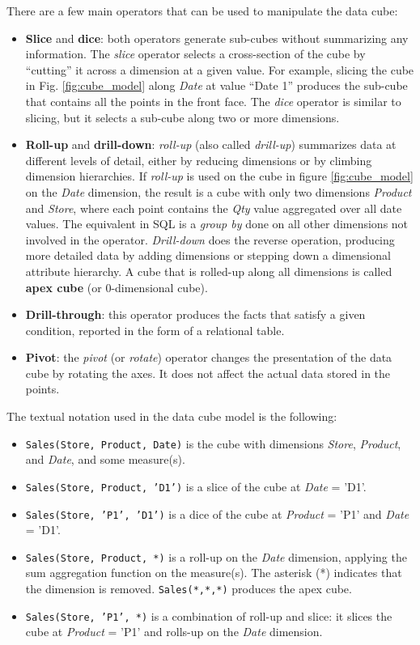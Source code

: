 There are a few main operators that can be used to manipulate the data cube:
\begin{itemize}
    \item \textbf{Slice} and \textbf{dice}: both operators generate sub-cubes without summarizing any information. The \textit{slice} operator selects a cross-section of the cube by ``cutting'' it across a dimension at a given value. For example, slicing the cube in Fig. \ref{fig:cube_model} along \textit{Date} at value ``Date 1'' produces the sub-cube that contains all the points in the front face. The \textit{dice} operator is similar to slicing, but it selects a sub-cube along two or more dimensions.
    \item \textbf{Roll-up} and \textbf{drill-down}: \textit{roll-up} (also called \textit{drill-up}) summarizes data at different levels of detail, either by reducing dimensions or by climbing dimension hierarchies. If \textit{roll-up} is used on the cube in figure \ref{fig:cube_model} on the \textit{Date} dimension, the result is a cube with only two dimensions \textit{Product} and \textit{Store}, where each point contains the \textit{Qty} value aggregated over all date values. The equivalent in SQL is a \textit{group by} done on all other dimensions not involved in the operator. \textit{Drill-down} does the reverse operation, producing more detailed data by adding dimensions or stepping down a dimensional attribute hierarchy. A cube that is rolled-up along all dimensions is called \textbf{apex cube} (or 0-dimensional cube).
    \item \textbf{Drill-through}: this operator produces the facts that satisfy a given condition, reported in the form of a relational table.
    \item \textbf{Pivot}: the \textit{pivot} (or \textit{rotate}) operator changes the presentation of the data cube by rotating the axes. It does not affect the actual data stored in the points.
\end{itemize}
The textual notation used in the data cube model is the following:
\begin{itemize}
    \item [-] \texttt{Sales(Store, Product, Date)} is the cube with dimensions \textit{Store}, \textit{Product}, and \textit{Date}, and some measure(s).
    \item [-] \texttt{Sales(Store, Product, 'D1')} is a slice of the cube at \textit{Date} = 'D1'.
    \item [-] \texttt{Sales(Store, 'P1', 'D1')} is a dice of the cube at \textit{Product} = 'P1' and \textit{Date} = 'D1'.
    \item [-] \texttt{Sales(Store, Product, *)} is a roll-up on the \textit{Date} dimension, applying the sum aggregation function on the measure(s). The asterisk (*) indicates that the dimension is removed. \texttt{Sales(*,*,*)} produces the apex cube.
    \item [-] \texttt{Sales(Store, 'P1', *)} is a combination of roll-up and slice: it slices the cube at \textit{Product} = 'P1' and rolls-up on the \textit{Date} dimension.
\end{itemize}

